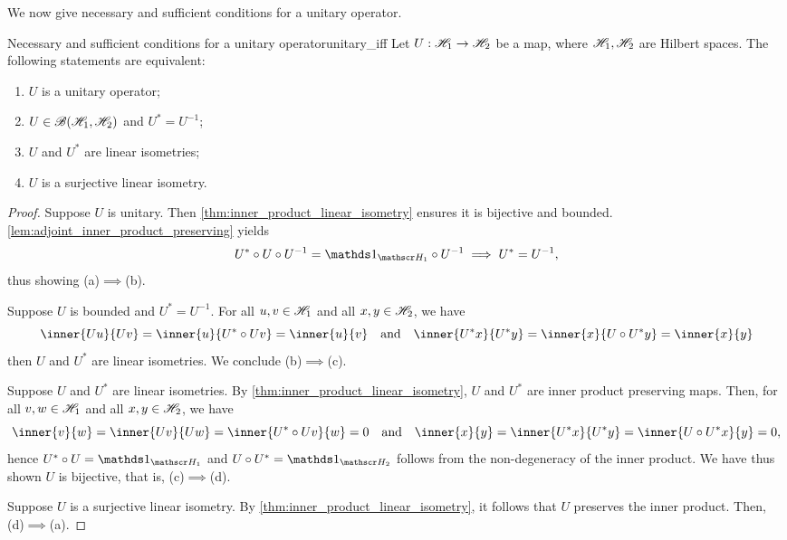 We now give necessary and sufficient conditions for a unitary operator.
\begin{theorem}{Necessary and sufficient conditions for a unitary operator}{unitary_iff}
    Let \(U : \mathscr{H}_1 \to \mathscr{H}_2\) be a map, where \(\mathscr{H}_1, \mathscr{H}_2\) are Hilbert spaces. The following statements are equivalent:
    \begin{enumerate}[label=(\alph*)]
        \item \(U\) is a unitary operator;
        \item \(U \in \mathscr{B}(\mathscr{H}_1, \mathscr{H}_2)\) and \(U^* = U^{-1}\);
        \item \(U\) and \(U^*\) are linear isometries;
        \item \(U\) is a surjective linear isometry.
    \end{enumerate}
\end{theorem}
\begin{proof}
    Suppose \(U\) is unitary. Then \cref{thm:inner_product_linear_isometry} ensures it is bijective and bounded. \cref{lem:adjoint_inner_product_preserving} yields
    \begin{equation*}
        U^* \circ U \circ U^{-1} = \unity_{\hilbert_1} \circ U^{-1} \implies U^* = U^{-1},
    \end{equation*}
    thus showing (a)\(\implies\)(b).

    Suppose \(U\) is bounded and \(U^* = U^{-1}\). For all \(u, v \in \mathscr{H}_1\) and all \(x, y \in \mathscr{H}_2\), we have
    \begin{equation*}
        \inner{Uu}{Uv} = \inner{u}{U^*\circ Uv} = \inner{u}{v}
        \quad\text{and}\quad
        \inner{U^*x}{U^*y} = \inner{x}{U\circ U^*y} = \inner{x}{y}
    \end{equation*}
    then \(U\) and \(U^*\) are linear isometries. We conclude (b)\(\implies\)(c).

    Suppose \(U\) and \(U^*\) are linear isometries. By \cref{thm:inner_product_linear_isometry}, \(U\) and \(U^*\) are inner product preserving maps. Then, for all \(v, w \in \mathscr{H}_1\) and all \(x, y \in \mathscr{H}_2\), we have
    \begin{equation*}
        \inner{v}{w} = \inner{Uv}{Uw} = \inner{U^*\circ Uv}{w} = 0
        \quad\text{and}\quad
        \inner{x}{y} = \inner{U^*x}{U^*y} = \inner{U \circ U^*x}{y} = 0,
    \end{equation*}
    hence \(U^*\circ U = \unity_{\hilbert_1}\) and \(U\circ U^* = \unity_{\hilbert_2}\) follows from the non-degeneracy of the inner product. We have thus shown \(U\) is bijective, that is, (c)\(\implies\)(d).

    Suppose \(U\) is a surjective linear isometry. By \cref{thm:inner_product_linear_isometry}, it follows that \(U\) preserves the inner product. Then, (d)\(\implies\)(a).
\end{proof}
